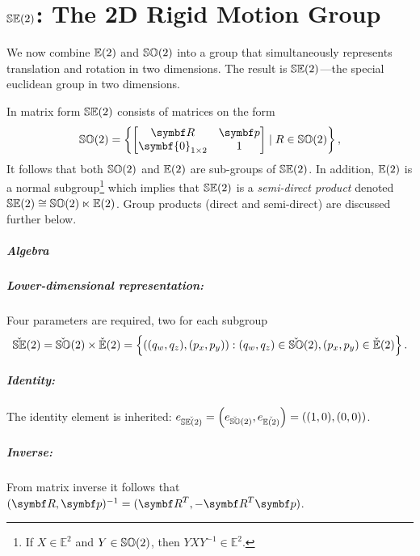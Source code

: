 \chapter{\texorpdfstring{${\mathbb{SE}(2)}$}{SE(2)}: The 2D Rigid Motion Group}

We now combine ${\mathbb{E}(2)}$ and ${\mathbb{SO}(2)}$ into a group that simultaneously represents translation and rotation in two dimensions. The result is ${\mathbb{SE}(2)}$---the special euclidean group in two dimensions.

In matrix form ${\mathbb{SE}(2)}$ consists of matrices on the form
\begin{equation}
  \label{eq:se2_matrix}
  \SOtwo = \left\{ \begin{bmatrix}
    \bR & \bp \\ \symbf{0}_{1 \times 2} & 1
  \end{bmatrix} \mid R \in \SOtwo \right\},
\end{equation}
It follows that both ${\mathbb{SO}(2)}$ and ${\mathbb{E}(2)}$ are sub-groups of ${\mathbb{SE}(2)}$. In addition, ${\mathbb{E}(2)}$ is a normal subgroup\footnote{If $X \in \mathbb{E}^2$ and $Y \in {\mathbb{SO}(2)}$, then $Y X Y^{-1} \in \mathbb{E}^2$.} which implies that ${\mathbb{SE}(2)}$ is a \emph{semi-direct product} denoted ${\mathbb{SE}(2)} \cong {\mathbb{SO}(2)} \ltimes {\mathbb{E}(2)}$. Group products (direct and semi-direct) are discussed further below.

\paragraph{Algebra}

\paragraph{Lower-dimensional representation:} Four parameters are required, two for each subgroup
\begin{equation}
  \check{\mathbb{SE}}(2) = \check{\mathbb{SO}}(2)  \times \check{\mathbb{E}}(2) = \left\{ ((q_w, q_z), (p_x, p_y)) : (q_w, q_z) \in \check{\mathbb{SO}}(2) , (p_x, p_y) \in \check{\mathbb{E}}(2) \right\}.
\end{equation}

\paragraph{Identity:} The identity element is inherited: $e_{\check{{\mathbb{SE}(2)}}} = \left( e_{\check{\mathbb{SO}}(2)}, e_{\check{{\mathbb{E}(2)}}} \right) = ((1, 0), (0, 0))$.

\paragraph{Inverse:} From matrix inverse it follows that $(\bR, \bp)^{-1} = (\bR^T, -\bR^T \bp)$.

